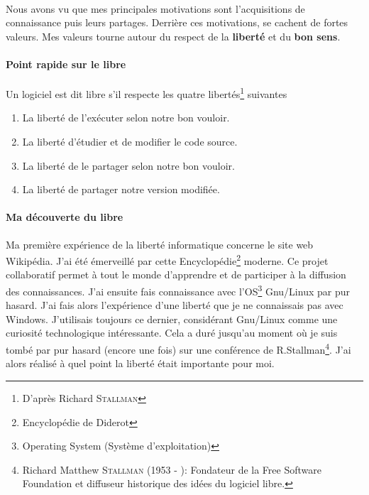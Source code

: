 \documentclass[a4paper,12pt, draft]{report}
\begin{document}
\paragraph{}
Nous avons vu que mes principales motivations sont l'acquisitions de connaissance puis leurs partages. Derrière ces motivations, se cachent de fortes valeurs.
Mes valeurs tourne autour du respect de la \textbf{liberté} et du \textbf{bon sens}.

\paragraph{Point rapide sur le libre}
Un logiciel est dit libre s'il respecte les quatre libertés\footnote{D'après Richard \textsc{Stallman}} suivantes
\begin{enumerate}
\item La liberté de l'exécuter selon notre bon vouloir.
\item La liberté d'étudier et de modifier le code source.
\item La liberté de le partager selon notre bon vouloir.
\item La liberté de partager notre version modifiée.
\end{enumerate}


\paragraph{Ma découverte du libre}

Ma première expérience de la liberté informatique concerne le site web Wikipédia. J'ai été émerveillé par cette Encyclopédie\footnote{Encyclopédie de Diderot} moderne.
Ce projet collaboratif permet à tout le monde d'apprendre et de participer à la diffusion des connaissances.
J'ai ensuite fais connaissance avec l'OS\footnote{Operating System (Système d'exploitation)} Gnu/Linux par pur hasard. J'ai fais alors l'expérience d'une liberté que je ne connaissais pas avec Windows. J'utilisais toujours ce dernier, considérant Gnu/Linux comme une curiosité technologique intéressante. 
Cela a duré jusqu'au moment où je suis tombé par pur hasard (encore une fois) sur une conférence de R.Stallman\footnote{Richard Matthew \textsc{Stallman} (1953 - ): Fondateur de la Free Software Foundation et diffuseur historique des idées du logiciel libre.}. J'ai alors réalisé à quel point la liberté était importante pour moi.
\end{document}
